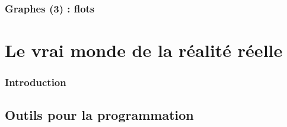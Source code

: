 \documentclass{minitelreport}
\begin{document}
\begin{refsection}
		\section{Graphes (3) : flots}
			\label{sec:graphes_et_flots}
			
\part{Le vrai monde de la réalité réelle}
\label{part:le_vrai_monde_de_la_réalité_réelle}
	\section*{Introduction}
	
	\chapter{Outils pour la programmation}
	\label{chap:outils}

\end{refsection}
\end{document}
